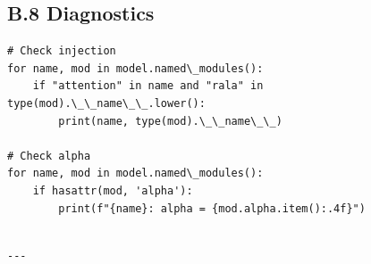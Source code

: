 \subsection{B.8 Diagnostics}

\begin{lstlisting}
# Check injection
for name, mod in model.named\_modules():
    if "attention" in name and "rala" in type(mod).\_\_name\_\_.lower():
        print(name, type(mod).\_\_name\_\_)

# Check alpha
for name, mod in model.named\_modules():
    if hasattr(mod, 'alpha'):
        print(f"{name}: alpha = {mod.alpha.item():.4f}")
\end{lstlisting}
\begin{lstlisting}

---
\end{lstlisting}